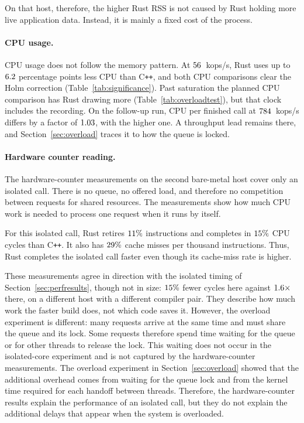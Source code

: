 \documentclass[english,oneside,a4paper,censored,csm,software-track-2020]{HYthesisML}
\begin{document}
On that host, therefore, the higher Rust RSS is not caused by Rust holding more
live application data. Instead, it is mainly a fixed cost of the process.

\paragraph{CPU usage.}
CPU usage does not follow the memory pattern. At $56$~kops/s, Rust
uses up to $6.2$ percentage points less CPU than C\texttt{++}, and
both CPU comparisons clear the Holm correction (Table~\ref{tab:significance}).
Past saturation the planned CPU comparison has Rust drawing more
(Table~\ref{tab:overloadtest}), but that clock includes the recording. On the
follow-up run, CPU per finished call at $784$~kops/s
differs by a factor of $1.03$, with
\ProbeAfterCpuPerOpHigher{} the higher one. A throughput lead remains there, and
Section~\ref{sec:overload} traces it to how the queue is locked.

\paragraph{Hardware counter reading.}

The hardware-counter measurements on the second bare-metal host cover only
an isolated call. There is no queue, no offered load, and therefore no
competition between requests for shared resources. The measurements show
how much CPU work is needed to process one request when it runs by itself.

For this isolated call, Rust retires $11\%$ \BmInstrDeltaDir{}
instructions and completes in $15\%$ \BmCycleDeltaDir{} CPU cycles
than C\texttt{++}. It also has $29\%$ \BmMissDeltaDir{} cache misses
per thousand instructions. Thus, Rust completes the isolated call
faster even though its cache-miss rate is higher.

These measurements agree in direction with the isolated timing of
Section~\ref{sec:perfresults}, though not in size: $15\%$ fewer
cycles here against $1.6\times$ there, on a different host with a
different compiler pair. They describe how much work the faster build does, not
which code saves it. However, the overload experiment is
different: many requests arrive at the same time and must share the queue
and its lock. Some requests therefore spend time waiting for the queue or
for other threads to release the lock. This waiting does not occur in the
isolated-core experiment and is not captured by the hardware-counter
measurements. The overload experiment in Section~\ref{sec:overload} showed that 
the additional overhead comes from waiting for the queue lock and from 
the kernel time required for each handoff between threads. 
Therefore, the hardware-counter results explain the performance of 
an isolated call, but they do not explain the additional delays 
that appear when the system is overloaded.
\end{document}
